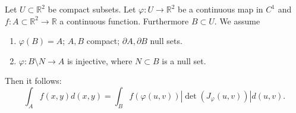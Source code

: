 \documentclass[10pt,landscape, a4paper]{article}
\newcommand{\custombox}[3]{\begin{tcolorbox}[left=0mm,right=0mm,bottom=0mm,top=0mm,title = \textbf{#1}, colback=#2!10!white, colframe = #2!70!white, coltitle=white, breakable]
    #3
    \end{tcolorbox}}
\newcommand{\theorem}[2]{\custombox{Theorem #1}{violet}{#2}}
\newcommand{\R}{\mathbb{R}}
\begin{document}
\begin{multicols*}{3}
    \theorem{4.4.2 (Change of variable formula).}{
        Let $U \subset \R^2$ be compact subsets. Let $\varphi:U \rightarrow \R^2$ be a continuous map in $C^1$ and $f:A\subset \R^2 \to \R$ a continuous function. Furthermore $B \subset U$. We assume
        \begin{enumerate}[label=(\arabic*)]
            \item $\varphi(B)=A$; $A,B$ compact; $\partial A, \partial B$ null sets.
            \item $\varphi: B\setminus N \to A$ is injective, where $N\subset B$ is a null set. 
        \end{enumerate}
        Then it follows:
        $$
        \int_{A} f(x,y) d(x,y)=\int_{B}f(\varphi(u,v))\left|\operatorname{det}\left(J_{\varphi}(u,v)\right)\right| d(u,v).
        $$
    }


\end{multicols*}
 
\end{document}
